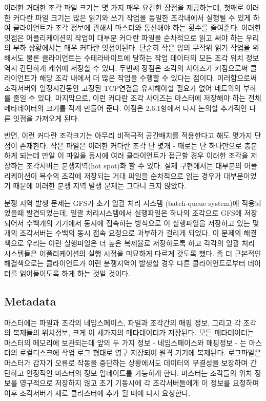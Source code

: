 \documentclass[twocolumn]{article}
\begin{document}
 이러한 거대한 조각 파일 크기는 몇 가지 매우 요긴한 장점을 제공하는데, 첫째로 이러한 커다란 파일 크기는 많은 읽기와 쓰기 작업을 동일한 조각내에서 실행될 수 있게 하여 클라이언트가 조각 정보에 관해서 마스터와 통신해야 하는 횟수를 줄여준다.  이러한 잇점은 어플리케이션의 작업이 대부분 커다란 파일을 순차적으로 읽고 써야 하는 우리의 부하 상황에서는 매우 커다란 잇점이된다. 단순히 작은 양의 무작위 읽기 작업을 위해서도 물론 클라이언트는 수테라바이트에 달하는 작업 데이터의 모든 조각 위치 정보역시 간단하게 캐쉬에 저장할 수 있다. 두번째 장점은 조각의 사이즈가 커짐으로써 클라이언트가 해당 조각 내에서 더 많은 작업을 수행할 수 있다는 점이다. 이러함으로써 조각서버와 일정시간동안 고정된 TCP연결을 유지해야할 필요가 없어 네트웍의 부하를 줄일 수 있다. 마지막으로, 이런 커다란 조각 사이즈는 마스터에 저장해야 하는 전체 메타데이터의 크기를 작게 만들어 준다.  이점은 2.6.1항에서 다시 논의할 추가적인 다른 잇점을 가져오게 된다.

 반면, 이런 커다란 조각크기는 아무리 비적극적 공간배치를 적용한다고 해도 몇가지 단점이 존재한다.  작은 파일은 이러한 커다란 조각 단 몇개 - 때로는 단 하나만으로 충분하게 되는데 만일 이 파일을 동시에 여러 클라이언트가 접근할 경우 이러한 조각을 저장하는 조각서버는 분쟁지역(hot spot)화 할 수 있다.  실제 구현에서는 대부분의 어플리케이션이 복수의 조각에 저장되는 거대 파일을 순차적으로 읽는 경우가 대부분이었기 때문에 이러한 분쟁 지역 발생 문제는 그다니 크지 않았다.

 분쟁 지역 발생 문제는 GFS가 초기 일괄 처리 시스템 (batch-queue system)에 적용되었을때 발견되었는데, 일괄 처리시스템에서 실행파일은 하나의 조각으로 GFS에 저장되어서 수백개의 기기에서 동시에 접속하는 방식으로 이 실행파일을 저장하고 있는 몇개의 조각서버는 수백의 동시 접속 요청으로 과부하가 걸리게 되었다.  이 문제의 해결책으로 우리는 이런 실행파일은 더 높은 복제율로 저장하도록 하고 각각의 일괄 처리 시스템들은 어플리케이션의 실행 시점을 미묘하게 다르게 갖도록 했다.  좀 더 근본적인 해결책으로는 클라이언트가 이런 분쟁지역이 발생할 경우 다른 클라이언트로부터 데이터를 읽어들이도록 하게 하는 것일 것이다.

\subsection{Metadata}

 마스터에는 파일과 조각의 네임스페이스, 파일과 조각간의 매핑 정보, 그리고 각 조각의 복제들의 위치정보, 크게 이 세가지의 메타데이터가 저장된다.  모든 메타데이터는 마스터의 메모리에 보관되는데 앞의 두 가지 정보 - 네임스페이스와 매핑정보 - 는 마스터의 로컬디스크에 작업 로그 형태로 영구 저장되어 원격 기기에 복제된다. 로그파일은 마스터가 갑자기 오류로 작동을 중단하는 상황에서도 데이터의 무결성을 보장하며 간단하고 안정적인 마스터의 정보 업데이트를 가능하게 한다.  마스터는 조각들의 위치 정보를 영구적으로 저장하지 않고 초기 기동시에 각 조각서버들에게 이 정보를 요청하며 이후 조각서버가 새로 클러스터에 추가 될 때에 다시 요청한다.
\end{document}
